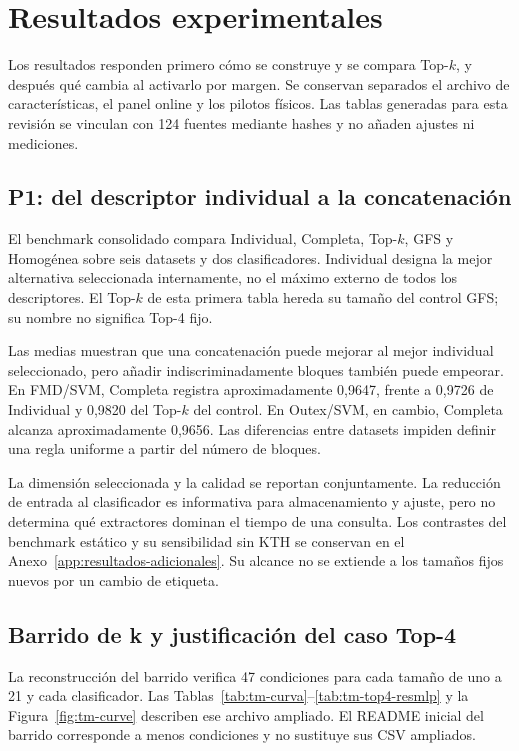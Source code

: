 \chapter{Resultados experimentales}\label{sec:resultados-experimentales}

Los resultados responden primero cómo se construye y se compara Top-\(k\), y después qué cambia al activarlo por margen. Se conservan separados el archivo de características, el panel online y los pilotos físicos. Las tablas generadas para esta revisión se vinculan con 124 fuentes mediante hashes y no añaden ajustes ni mediciones.

\section{P1: del descriptor individual a la concatenación}\label{sec:resultados-fase1}
El benchmark consolidado compara Individual, Completa, Top-\(k\), GFS y Homogénea sobre seis datasets y dos clasificadores. Individual designa la mejor alternativa seleccionada internamente, no el máximo externo de todos los descriptores. El Top-\(k\) de esta primera tabla hereda su tamaño del control GFS; su nombre no significa Top-4 fijo.




Las medias muestran que una concatenación puede mejorar al mejor individual seleccionado, pero añadir indiscriminadamente bloques también puede empeorar. En FMD/SVM, Completa registra aproximadamente 0,9647, frente a 0,9726 de Individual y 0,9820 del Top-\(k\) del control. En Outex/SVM, en cambio, Completa alcanza aproximadamente 0,9656. Las diferencias entre datasets impiden definir una regla uniforme a partir del número de bloques.

La dimensión seleccionada y la calidad se reportan conjuntamente. La reducción de entrada al clasificador es informativa para almacenamiento y ajuste, pero no determina qué extractores dominan el tiempo de una consulta. Los contrastes del benchmark estático y su sensibilidad sin KTH se conservan en el Anexo~\ref{app:resultados-adicionales}. Su alcance no se extiende a los tamaños fijos nuevos por un cambio de etiqueta.

\section{Barrido de k y justificación del caso Top-4}
La reconstrucción del barrido verifica 47 condiciones para cada tamaño de uno a 21 y cada clasificador. Las Tablas~\ref{tab:tm-curva}--\ref{tab:tm-top4-resmlp} y la Figura~\ref{fig:tm-curve} describen ese archivo ampliado. El README inicial del barrido corresponde a menos condiciones y no sustituye sus CSV ampliados.


